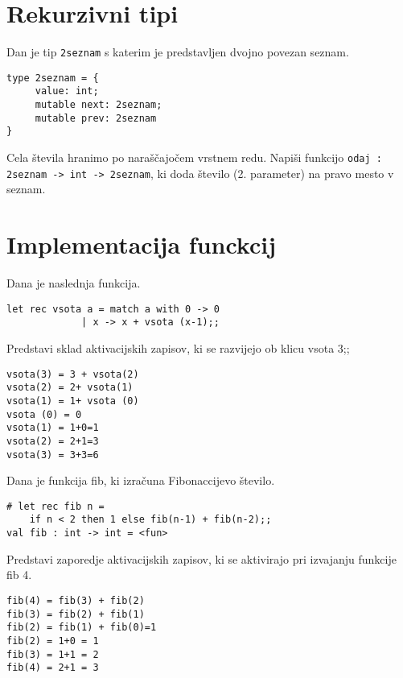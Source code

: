 \section{Rekurzivni tipi}


\begin{ex}
Dan je tip \lstinline{2seznam} s katerim je predstavljen dvojno povezan seznam.

\begin{lstlisting}
type 2seznam = {
     value: int;
     mutable next: 2seznam;
     mutable prev: 2seznam
}
\end{lstlisting}

Cela \v stevila hranimo po nara\v s\v cajo\v cem vrstnem redu. Napi\v si funkcijo \lstinline{odaj : 2seznam -> int -> 2seznam}, ki doda \v stevilo (2. parameter) na pravo mesto v seznam.
\end{ex} 






\section{Implementacija funckcij}




\begin{ex}
Dana je naslednja funkcija.
\begin{lstlisting}
let rec vsota a = match a with 0 -> 0 
             | x -> x + vsota (x-1);;
\end{lstlisting}

Predstavi sklad aktivacijskih zapisov, ki se razvijejo ob klicu vsota 3;;

\begin{sol}
\begin{lstlisting}
vsota(3) = 3 + vsota(2)
vsota(2) = 2+ vsota(1)
vsota(1) = 1+ vsota (0)
vsota (0) = 0
vsota(1) = 1+0=1
vsota(2) = 2+1=3
vsota(3) = 3+3=6
\end{lstlisting}
\end{sol}
\end{ex}




\begin{ex}
Dana je funkcija fib, ki izra\v cuna Fibonaccijevo \v stevilo.

\begin{lstlisting}
# let rec fib n =
    if n < 2 then 1 else fib(n-1) + fib(n-2);;
val fib : int -> int = <fun>
\end{lstlisting}
Predstavi zaporedje aktivacijskih zapisov, ki se aktivirajo pri izvajanju funkcije fib 4.

\begin{sol}
\begin{lstlisting}
fib(4) = fib(3) + fib(2)
fib(3) = fib(2) + fib(1)
fib(2) = fib(1) + fib(0)=1
fib(2) = 1+0 = 1
fib(3) = 1+1 = 2
fib(4) = 2+1 = 3
\end{lstlisting}
\end{sol}

\end{ex}






